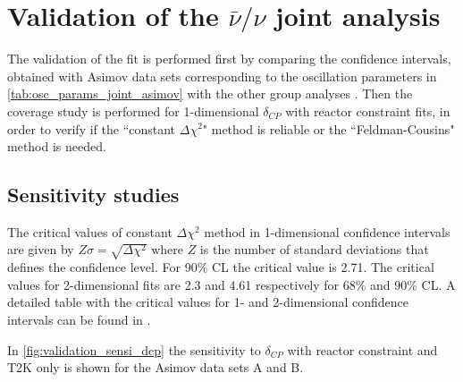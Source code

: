 \clearpage

\section{Validation of the $\bar{\nu}/\nu$ joint analysis}
\label{sec:validation}

The validation of the fit is performed first by comparing the confidence intervals, obtained
with Asimov data sets corresponding to the oscillation parameters in \cref{tab:osc_params_joint_asimov}
with the other group analyses \cite{Mach3JointFitRun16}.
Then the coverage study is performed for 1-dimensional $\delta_{CP}$ with reactor constraint fits,
in order to verify if the ``constant $\Delta \chi^2$" method is reliable or
the ``Feldman-Cousins" method is needed.


%
%

\subsection{Sensitivity studies}
\label{sec:sensi}

The critical values of constant $\Delta \chi^2$ method
in 1-dimensional confidence intervals are given 
by $Z\sigma = \sqrt{\Delta \chi^2}$  
where $Z$ is the number of standard deviations that
defines the confidence level.
For 90\% CL the critical value is 2.71.
The critical values for 2-dimensional fits are 2.3 and 4.61
respectively for 68\% and 90\% CL.
A detailed table with the critical values for 1- and 2-dimensional confidence
intervals can be found in \cite{pdg_stat}.

In \cref{fig:validation_sensi_dcp} the sensitivity to $\delta_{CP}$ 
with reactor constraint and T2K only is shown for the Asimov data sets A and B.

